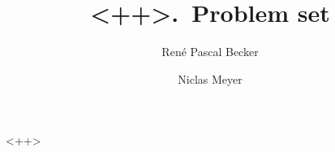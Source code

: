 \documentclass[11pt]{article}
\title{<++>.\ Problem set}
\author{René Pascal Becker \and Niclas Meyer}
\date{}
\begin{document}
\maketitle

<++>
\end{document}
